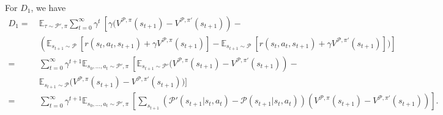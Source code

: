 \documentclass[letterpaper]{article} %
\def\E{{\mathbb{E}}}
\def\P{{\mathcal{P}}}
\begin{document}
For $D_1$, we have
{\small
\begin{align*}
D_1
=\ &\E_{\tau\sim \P',\pi}\sum_{t=0}^{\infty}\gamma^t\ 
\left[
\gamma \bigg(V^{\P,\pi}(s_{t+1})-V^{\P,\pi'}(s_{t+1})\right)-
\\
\ &\left(
\E_{s_{t+1}\sim \P}\ 
[r(s_t,a_t,s_{t+1})+\gamma V^{\P,\pi}(s_{t+1})]-
\E_{s_{t+1}\sim \P}\ 
[r(s_t,a_t,s_{t+1})+\gamma V^{\P,\pi'}(s_{t+1})]
\bigg)
\right]
\\
=\ &
\sum_{t=0}^{\infty}\gamma^{t+1}\E_{s_0,\ldots, a_t\sim \P', \pi}\ 
\left[
\E_{s_{t+1}\sim \P'}
\bigg(V^{\P,\pi}(s_{t+1})-V^{\P,\pi'}(s_{t+1})\right)-
\\
&\E_{s_{t+1}\sim \P}
\bigg(V^{\P,\pi}(s_{t+1})-V^{\P,\pi'}(s_{t+1})\bigg)
\bigg]
\\
=\ &\sum_{t=0}^{\infty}\gamma^{t+1}\E_{s_0,\ldots, a_t\sim \P', \pi}\ 
\left[
\sum_{s_{t+1}}\left(\P'(s_{t+1}|s_t,a_t)-\P(s_{t+1}|s_t,a_t)\right)
\left(
V^{\P,\pi}(s_{t+1})-V^{\P,\pi'}(s_{t+1})
\right)
\right].
\end{align*}
}\noindent
\end{document}
